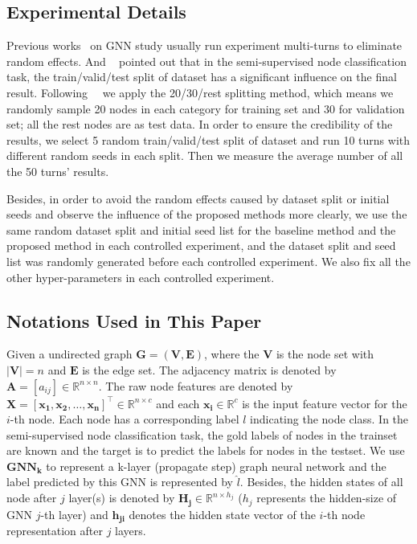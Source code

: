 \documentclass[letterpaper]{article} \usepackage{aaai20}  \usepackage{times}  \usepackage{helvet} \usepackage{courier}  \usepackage[hyphens]{url}  \usepackage{graphicx} \urlstyle{rm} \def\UrlFont{\rm}  \frenchspacing  \setlength{\pdfpagewidth}{8.5in}  \setlength{\pdfpageheight}{11in}  \setcounter{secnumdepth}{0}
\newcommand{\citet}[1]{\citeauthor{#1}~\shortcite{#1}}
\newcommand{\citep}{\cite}
\begin{document}
\subsection{Experimental Details}
Previous works~\citep{model_gat,model_hyper_graph,graph2seq_liweiacl} on GNN study usually run experiment multi-turns to eliminate random effects. And \citet{dataset_amazon} pointed out that in the semi-supervised node classification task, the train/valid/test split of dataset has a significant influence on the final result. 
Following~\citet{dataset_amazon,method_fishergcn} we apply the 20/30/rest splitting method, which means we randomly sample 20 nodes in each category for training set and 30 for validation set; all the rest nodes are as test data.
In order to ensure the credibility of the results, we select 5 random train/valid/test split of dataset and run 10 turns with different random seeds in each split. Then we measure the average number of all the 50 turns' results.

Besides, in order to avoid the random effects caused by dataset split or initial seeds and observe the influence of the proposed methods more clearly, we use the same random dataset split and initial seed list for the baseline method and the proposed method in each controlled experiment, and the dataset split and seed list was randomly generated before each controlled experiment. We also fix all the other hyper-parameters in each controlled experiment. 

\subsection{Notations Used in This Paper}
Given a undirected graph $\bm{G}  = \left ( \bm{V},\bm{E} \right )$, where the $\bm{V}$ is the node set with $|\bm{V}|=n $ and $\bm{E}$ is the edge set. 
The adjacency matrix is denoted by $\bm{A} = [a_{ij}] \in \mathbb{R}^{n\times n}$. The raw node features are denoted by $\bm{X} = [\bm{x_1},\bm{x_2},\dots,\bm{x_n}]^\top \in \mathbb{R}^{n \times c}$ and each $\bm{x_i} \in \mathbb{R}^{c}$ is the input feature vector for the $i$-th node. 
Each node has a corresponding label $l $ indicating the node class. In the semi-supervised node classification task, the gold labels of nodes in the trainset are known and the target is to predict the labels for nodes in the testset.
We use $\mathbf{GNN_k}$ to represent a k-layer (propagate step) graph neural network and the label predicted by this GNN is represented by $ \hat{l}$. Besides, the hidden states of all node after $j$ layer(s) is denoted by $\bm{H_j} \in \mathbb{R}^{n\times h_j}$ ($h_j$ represents the hidden-size of GNN $j$-th layer) and $\bm{h_{ji}}$ denotes the hidden state vector of the $i$-th node representation after $j$ layers.
\end{document}
